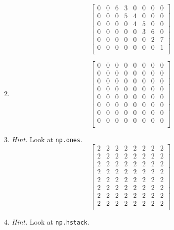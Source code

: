 \documentclass{article}
\theoremstyle{remark}
\begin{document}
\begin{enumerate}
\begin{displaymath}
\begin{bmatrix}
      0 & 0 & 6 & 3 & 0 & 0 & 0 & 0 \\
      0 & 0 & 0 & 5 & 4 & 0 & 0 & 0 \\
      0 & 0 & 0 & 0 & 4 & 5 & 0 & 0 \\
      0 & 0 & 0 & 0 & 0 & 3 & 6 & 0 \\
      0 & 0 & 0 & 0 & 0 & 0 & 2 & 7 \\
      0 & 0 & 0 & 0 & 0 & 0 & 0 & 1 \\
    \end{bmatrix}
  \end{displaymath}
\item
  \begin{displaymath}
    \begin{bmatrix}
      0 & 0 & 0 & 0 & 0 & 0 & 0 & 0 \\
      0 & 0 & 0 & 0 & 0 & 0 & 0 & 0 \\
      0 & 0 & 0 & 0 & 0 & 0 & 0 & 0 \\
      0 & 0 & 0 & 0 & 0 & 0 & 0 & 0 \\
      0 & 0 & 0 & 0 & 0 & 0 & 0 & 0 \\
      0 & 0 & 0 & 0 & 0 & 0 & 0 & 0 \\
      0 & 0 & 0 & 0 & 0 & 0 & 0 & 0 \\
      0 & 0 & 0 & 0 & 0 & 0 & 0 & 0 \\
    \end{bmatrix}
  \end{displaymath}
\item \textit{Hint.} Look at \texttt{np.ones}.
  \begin{displaymath}
    \begin{bmatrix}
      2 & 2 & 2 & 2 & 2 & 2 & 2 & 2 \\
      2 & 2 & 2 & 2 & 2 & 2 & 2 & 2 \\
      2 & 2 & 2 & 2 & 2 & 2 & 2 & 2 \\
      2 & 2 & 2 & 2 & 2 & 2 & 2 & 2 \\
      2 & 2 & 2 & 2 & 2 & 2 & 2 & 2 \\
      2 & 2 & 2 & 2 & 2 & 2 & 2 & 2 \\
      2 & 2 & 2 & 2 & 2 & 2 & 2 & 2 \\
      2 & 2 & 2 & 2 & 2 & 2 & 2 & 2 \\
    \end{bmatrix}
  \end{displaymath}
\item \textit{Hint.} Look at \texttt{np.hstack}.
  \begin{displaymath}

\end{displaymath}
\end{enumerate}
\end{document}
